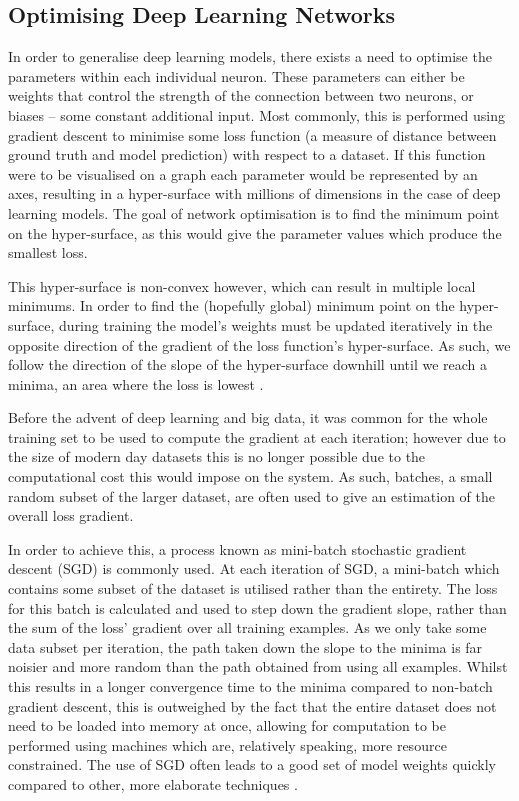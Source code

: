 \subsection{Optimising Deep Learning Networks}\label{ch:Background,sec:DLIntro,sub:stochasticgradientdescent}

In order to generalise deep learning models, there exists a need to optimise the parameters within each individual neuron. These parameters can either be weights that control the strength of the connection between two neurons, or biases -- some constant additional input. Most commonly, this is performed using gradient descent to minimise some loss function (a measure of distance between ground truth and model prediction) with respect to a dataset. If this function were to be visualised on a graph each parameter would be represented by an axes, resulting in a hyper-surface with millions of dimensions in the case of deep learning models. The goal of network optimisation is to find the minimum point on the hyper-surface, as this would give the parameter values which produce the smallest loss. 

This hyper-surface is non-convex however, which can result in multiple local minimums. In order to find the (hopefully global) minimum point on the hyper-surface, during training the model's weights must be updated iteratively in the opposite direction of the gradient of the loss function's hyper-surface. As such, we follow the direction of the slope of the hyper-surface downhill until we reach a minima, an area where the loss is lowest \cite{ruder_overview_2016}. 

Before the advent of deep learning and big data, it was common for the whole training set to be used to compute the gradient at each iteration; however due to the size of modern day datasets this is no longer possible due to the computational cost this would impose on the system. As such, batches, a small random subset of the larger dataset, are often used to give an estimation of the overall loss gradient.

In order to achieve this, a process known as mini-batch stochastic gradient descent (SGD) is commonly used. At each iteration of SGD, a mini-batch which contains some subset of the dataset is utilised rather than the entirety. The loss for this batch is calculated and used to step down the gradient slope, rather than the sum of the loss' gradient over all training examples. As we only take some data subset per iteration, the path taken down the slope to the minima is far noisier and more random than the path obtained from using all examples. Whilst this results in a longer convergence time to the minima compared to non-batch gradient descent, this is outweighed by the fact that the entire dataset does not need to be loaded into memory at once, allowing for computation to be performed using machines which are, relatively speaking, more resource constrained. The use of SGD often leads to a good set of model weights quickly compared to other, more elaborate techniques \cite{bottou_tradeoffs_2008}. 

